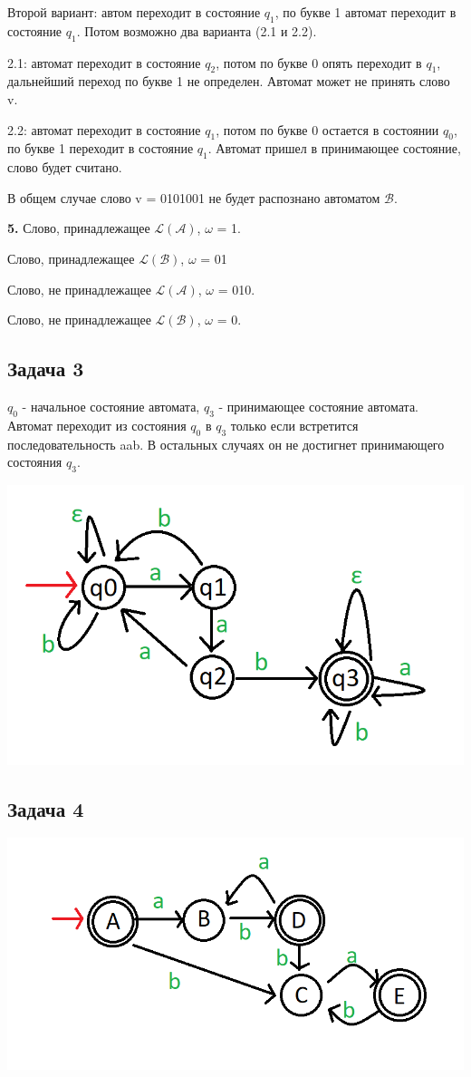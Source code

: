 \documentclass[a4paper,14pt]{article} %
\begin{document}
Второй вариант: автом переходит в состояние $q_1$, по букве 1 автомат переходит в состояние $q_1$. Потом возможно два варианта (2.1 и 2.2).

2.1: автомат переходит в состояние $q_2$, потом по букве 0 опять переходит в $q_1$, дальнейший переход по букве 1 не определен. Автомат может не принять слово v.

2.2: автомат переходит в состояние $q_1$, потом по букве 0 остается в состоянии $q_0$, по букве 1 переходит в состояние $q_1$. Автомат пришел в принимающее состояние, слово будет считано.

В общем случае слово v = 0101001 не будет распознано автоматом $\mathcal{B}$.

\textbf{5.} Слово, принадлежащее $\mathcal{L(A)}$, $\omega$ = 1. 

Слово, принадлежащее $\mathcal{L(B)}$, $\omega$ = 01

Слово, не принадлежащее $\mathcal{L(A)}$, $\omega$ = 010. 

Слово, не принадлежащее $\mathcal{L(B)}$, $\omega$ = 0.

\subsection{Задача 3}
$q_0$ - начальное состояние автомата, $q_3$ - принимающее состояние автомата.
Автомат переходит из состояния $q_0$ в $q_3$ только если встретится последовательность aab. В остальных случаях он не достигнет принимающего состояния $q_3$.

\includegraphics[scale=0.6]{01.png}

\subsection{Задача 4}
\includegraphics[scale=0.6]{02.png}
\end{document}
